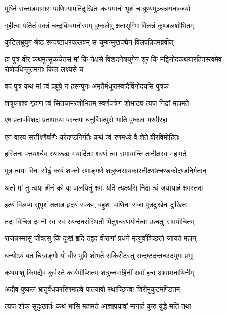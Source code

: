 \twolineshloka
{मूर्ध्नि सन्ताडयामास पाणिभ्यामतिदुःखितः}
{कम्पमानो भृशं चाश्रूण्यमुञ्चन्नयनाब्जयोः}%

\twolineshloka
{गृहीत्वा पतितं वक्त्रं चन्द्रबिम्बमनोरमम्}
{पुष्कलेषु क्षतासृग्भिः क्लिन्नं कुण्डलशोभितम्}%

\twolineshloka
{कुटिलभ्रूयुगं श्रेष्ठं सन्दष्टाधरपल्लवम्}
{स चुम्बन्मुखपद्मेन विलपन्निदमब्रवीत्}%

\fourlineindentedshloka
{हा पुत्र वीर कथमुत्सुकचेतसं मां}
{किं नेक्षसे विशदनेत्रयुगेन शूर}
{किं मद्विनोदकथयारहितस्त्वमेव}
{रोषोदधिप्लुतमनाः किल लक्ष्यसे च}%

\twolineshloka
{वद पुत्र कथं मां त्वं प्रब्रूषे न हसन्पुनः}
{अमृतैर्मधुरास्वादैर्विनोदयसि पुत्रक}%

\twolineshloka
{शत्रुघ्नाश्वं गृहाण त्वं सितचामरशोभितम्}
{स्वर्णपत्रेण शोभाढ्यं त्यज निद्रां महामते}%

\twolineshloka
{एष प्रतापविशदः प्रतापाग्र्यः परन्तपः}
{धनुर्बिभ्रत्पुरो भाति पुष्कलः परवीरहा}%

\twolineshloka
{एनं वारय सत्तीक्ष्णैर्बाणैः कोदण्डनिर्गतैः}
{कथं त्वं रणमध्ये वै शेते वीरविमोहितः}%

\twolineshloka
{हस्तिनः पत्तयश्चैव रथारूढा भयार्दिताः}
{शरणं त्वां समायान्ति तानीक्षस्व महामते}%

\twolineshloka
{पुत्र त्वया विना सोढुं कथं शक्तो रणाङ्गणे}
{शत्रुघ्नसायकांस्तीक्ष्णांश्चण्डकोदण्डनिर्गतान्}%

\twolineshloka
{अतो मां तु त्वया हीनं को वा पालयितुं क्षमः}
{यदि त्यक्ष्यसि निद्रा त्वं जयायाहं क्षमस्तदा}%

\twolineshloka
{इत्थं विलप्य सुभृशं तताड हृदयं स्वकम्}
{बहुशः पाणिना राजा पुत्रदुःखेन दुःखितः}%

\twolineshloka
{तदा विचित्र दमनौ स्व स्व स्यन्दनसंस्थितौ}
{पितुश्चरणयोर्नत्वा ऊचतुः समयोचितम्}%

\twolineshloka
{राजन्नस्मासु जीवत्सु किं दुःखं हृदि तद्वद}
{वीराणां प्रधने मृत्युर्वाञ्च्छितो जायते महान्}%

\twolineshloka
{धन्योऽयं बत चित्राङ्गो यो वीर भुवि शोभते}
{सकिरीटस्तु सन्दष्टदन्तच्छदयुगः प्रभुः}%

\twolineshloka
{कथयाशु किमद्यैव कुर्वस्ते कार्यमीप्सितम्}
{शत्रुघ्नवाहिनीं सर्वां हन्व आवामनाथिनीम्}%

\twolineshloka
{अद्यैव पुष्कलं भ्रातुर्वधकारिणमाहवे}
{पातयावो रथाच्छित्त्वा शिरोमुकुटमण्डितम्}%

\twolineshloka
{त्यज शोकं सुदुःखार्तः कथं भासि महामते}
{आज्ञापयावां मानार्ह कुरु युद्धे मतिं तथा}%

